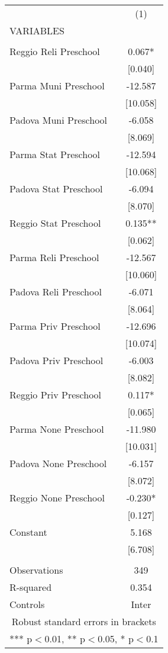 \begin{tabular}{lc} \hline
 & (1) \\
VARIABLES &  \\ \hline
 &  \\
Reggio Reli Preschool & 0.067* \\
 & [0.040] \\
Parma Muni Preschool & -12.587 \\
 & [10.058] \\
Padova Muni Preschool & -6.058 \\
 & [8.069] \\
Parma Stat Preschool & -12.594 \\
 & [10.068] \\
Padova Stat Preschool & -6.094 \\
 & [8.070] \\
Reggio Stat Preschool & 0.135** \\
 & [0.062] \\
Parma Reli Preschool & -12.567 \\
 & [10.060] \\
Padova Reli Preschool & -6.071 \\
 & [8.064] \\
Parma Priv Preschool & -12.696 \\
 & [10.074] \\
Padova Priv Preschool & -6.003 \\
 & [8.082] \\
Reggio Priv Preschool & 0.117* \\
 & [0.065] \\
Parma None Preschool & -11.980 \\
 & [10.031] \\
Padova None Preschool & -6.157 \\
 & [8.072] \\
Reggio None Preschool & -0.230* \\
 & [0.127] \\
Constant & 5.168 \\
 & [6.708] \\
 &  \\
Observations & 349 \\
R-squared & 0.354 \\
 Controls & Inter \\ \hline
\multicolumn{2}{c}{ Robust standard errors in brackets} \\
\multicolumn{2}{c}{ *** p$<$0.01, ** p$<$0.05, * p$<$0.1} \\
\end{tabular}
